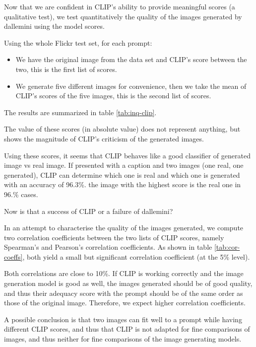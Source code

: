 \documentclass{article}
\begin{document}
\begin{multicols}{2}
Now that we are confident in CLIP's ability to provide meaningful scores (a qualitative test), we test quantitatively the quality of the images generated by \gls{dallemini} using the model scores. 

Using the whole Flickr test set, for each prompt: 
\begin{itemize}
    \item We have the original image from the data set and CLIP's score between the two, this is the first list of scores.
    \item We generate five different images for convenience, then we take the mean of CLIP's scores of the five images, this is the second list of scores.
\end{itemize}

The results are summarized in table \ref{tab:inq-clip}.

The value of these scores (in absolute value) does not represent anything, but shows the magnitude of CLIP's criticism of the generated images.

Using these scores, it seems that CLIP behaves like a good classifier of generated image vs real image. If presented with a caption and two images (one real, one generated), CLIP can determine which one is real and which one is generated with an accuracy of 96.3\%. the image with the highest score is the real one in 96.\% cases.

Now is that a success of CLIP or a failure of \gls{dallemini}?

In an attempt to characterise the quality of the images generated, we compute two correlation coefficients between the two lists of CLIP scores, namely Spearman's and Pearson's correlation coefficients. As shown in table \ref{tab:cor-coeffs}, both yield a small but significant correlation coefficient (at the 5\% level).

Both correlations are close to 10\%. If CLIP is working correctly and the image generation model is good as well, the images generated should be of good quality, and thus their adequacy score with the prompt should be of the same order as those of the original image. Therefore, we expect higher correlation coefficients. 

A possible conclusion is that two images can fit well to a prompt while having different CLIP scores, and thus that CLIP is not adapted for fine comparisons of images, and thus neither for fine comparisons of the image generating models. 


\end{multicols}
\end{document}
